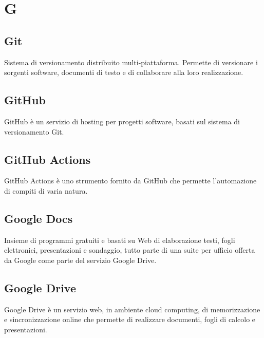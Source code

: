 \section{G}
	\subsection{Git}  
		Sistema di versionamento distribuito multi-piattaforma. Permette di versionare i sorgenti software, documenti di testo e di collaborare alla loro realizzazione.
	\subsection{GitHub}  
		GitHub è un servizio di hosting per progetti software, basati sul sistema di versionamento Git.
	\subsection{GitHub Actions}  
		GitHub Actions è uno strumento fornito da GitHub che permette l'automazione di compiti di varia natura.
	\subsection{Google Docs}
		Insieme di programmi gratuiti e basati su Web di elaborazione testi, fogli elettronici, presentazioni e sondaggio, tutto parte di una suite per ufficio offerta da Google come parte del servizio Google Drive.
	\subsection{Google Drive}  
		Google Drive è un servizio web, in ambiente cloud computing, di memorizzazione e sincronizzazione online che permette di realizzare documenti, fogli di calcolo e presentazioni.
	
		



\newpage